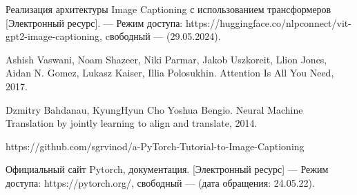 \begin{thebibliography}{0}
	
	Реализация архитектуры Image Captioning с использованием трансформеров [Электронный ресурс]. — Режим доступа: https://huggingface.co/nlpconnect/vit-gpt2-image-captioning, cвободный — (29.05.2024).
	
	Ashish Vaswani, Noam Shazeer, Niki Parmar, Jakob Uszkoreit, Llion Jones, Aidan N. Gomez, Lukasz Kaiser, Illia Polosukhin. Attention Is All You Need, 2017.
	
	Dzmitry Bahdanau, KyungHyun Cho Yoshua Bengio. Neural Machine Translation by jointly learning to align and translate, 2014.
	
	https://github.com/sgrvinod/a-PyTorch-Tutorial-to-Image-Captioning
	
	 Официальный сайт Pytorch, документация. [Электронный ресурс] — Режим доступа: https://pytorch.org/, свободный — (дата обращения: 24.05.22).
	
\end{thebibliography}
